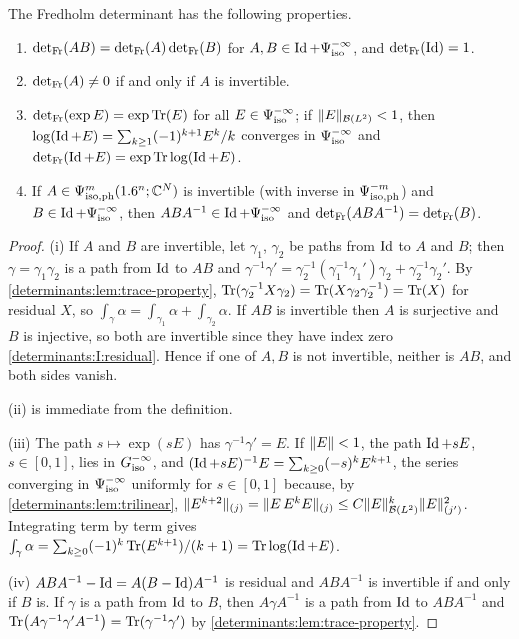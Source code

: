 \begin{proposition}\label{determinants:prop:det-basic}
  The Fredholm determinant has the following properties.
  \begin{enumerate}[label=(\roman*)]
  \item\label{determinants:it:mult} $\operatorname{det}_{\mathrm{Fr}}(AB)=\operatorname{det}_{\mathrm{Fr}}(A)\operatorname{det}_{\mathrm{Fr}}(B)$ for
    $A,B\in\operatorname{Id}+\Psi^{-\infty}_{\mathrm{iso}}$, and $\operatorname{det}_{\mathrm{Fr}}(\operatorname{Id})=1$.
  \item $\operatorname{det}_{\mathrm{Fr}}(A)\ne0$ if and only if $A$ is invertible.
  \item\label{determinants:it:explog} $\operatorname{det}_{\mathrm{Fr}}(\exp E)=\exp\operatorname{Tr}(E)$ for all
    $E\in\Psi^{-\infty}_{\mathrm{iso}}$; if $\lVert E\rVert_{\mathcal{B}(L^2)}<1$, then
    $\log(\operatorname{Id}+E)=\sum_{k\ge1}(-1)^{k+1}E^k/k$ converges in $\Psi^{-\infty}_{\mathrm{iso}}$
    and $\operatorname{det}_{\mathrm{Fr}}(\operatorname{Id}+E)=\exp\operatorname{Tr}\log(\operatorname{Id}+E)$.
  \item\label{determinants:it:conj} If $A\in\Psi^{m}_{\mathrm{iso,ph}}(1.6^n;\mathbb{C}^N)$ is
    invertible (with inverse in $\Psi^{-m}_{\mathrm{iso,ph}}$) and $B\in\operatorname{Id}+\Psi^{-\infty}_{\mathrm{iso}}$,
    then $ABA^{-1}\in\operatorname{Id}+\Psi^{-\infty}_{\mathrm{iso}}$ and $\operatorname{det}_{\mathrm{Fr}}(ABA^{-1})=\operatorname{det}_{\mathrm{Fr}}(B)$.
  \end{enumerate}
\end{proposition}
\begin{proof}
  (i) If $A$ and $B$ are invertible, let $\gamma_1$, $\gamma_2$ be paths from
  $\operatorname{Id}$ to $A$ and $B$; then $\gamma=\gamma_1\gamma_2$ is a path from $\operatorname{Id}$ to
  $AB$ and
  $\gamma^{-1}\gamma'=\gamma_2^{-1}(\gamma_1^{-1}\gamma_1')\gamma_2+\gamma_2^{-1}\gamma_2'$.
  By \cref{determinants:lem:trace-property},
  $\operatorname{Tr}(\gamma_2^{-1}X\gamma_2)=\operatorname{Tr}(X\gamma_2\gamma_2^{-1})=\operatorname{Tr}(X)$ for residual
  $X$, so $\int_\gamma\alpha=\int_{\gamma_1}\alpha+\int_{\gamma_2}\alpha$. If
  $AB$ is invertible then $A$ is surjective and $B$ is injective, so both are
  invertible since they have index zero \ref{determinants:I:residual}. Hence
  if one of $A,B$ is not invertible, neither is $AB$, and both sides vanish.

  (ii) is immediate from the definition.

  (iii) The path $s\mapsto\exp(sE)$ has $\gamma^{-1}\gamma'=E$. If
  $\lVert E\rVert<1$, the path $\operatorname{Id}+sE$, $s\in[0,1]$, lies in $G^{-\infty}_{\mathrm{iso}}$, and
  $(\operatorname{Id}+sE)^{-1}E=\sum_{k\ge0}(-s)^kE^{k+1}$, the series converging in
  $\Psi^{-\infty}_{\mathrm{iso}}$ uniformly for $s\in[0,1]$ because, by
  \cref{determinants:lem:trilinear},
  $\lVert E^{k+2}\rVert_{(j)}=\lVert E\,E^{k}E\rVert_{(j)}\le C\lVert E\rVert_{\mathcal{B}(L^2)}^k\lVert E\rVert_{(j')}^2$.
  Integrating term by term gives
  $\int_\gamma\alpha=\sum_{k\ge0}(-1)^k\operatorname{Tr}(E^{k+1})/(k+1)=\operatorname{Tr}\log(\operatorname{Id}+E)$.

  (iv) $ABA^{-1}-\operatorname{Id}=A(B-\operatorname{Id})A^{-1}$ is residual and $ABA^{-1}$ is invertible
  if and only if $B$ is. If $\gamma$ is a path from $\operatorname{Id}$ to $B$, then
  $A\gamma A^{-1}$ is a path from $\operatorname{Id}$ to $ABA^{-1}$ and
  $\operatorname{Tr}\bigl(A\gamma^{-1}\gamma'A^{-1}\bigr)=\operatorname{Tr}(\gamma^{-1}\gamma')$ by
  \cref{determinants:lem:trace-property}.
\end{proof}

